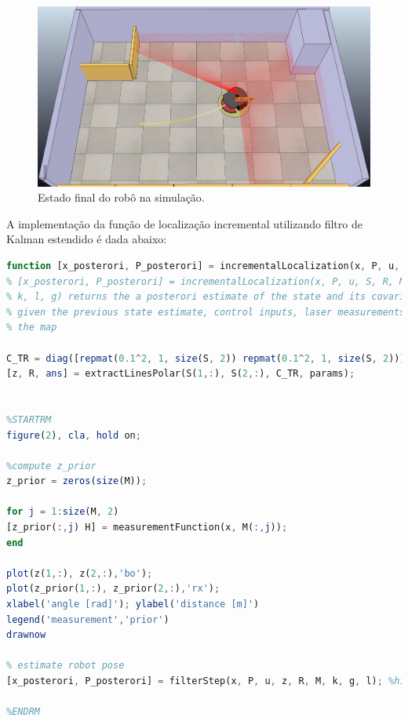 \begin{figure}[H]
	\centering
	\includegraphics[width=0.9\linewidth]{img/vrep}
	\caption{Estado final do robô na simulação.}
	\label{fig:vrep}
\end{figure}

A implementação da função de localização incremental utilizando filtro de Kalman estendido é dada abaixo:

\begin{lstlisting}[language=Octave]
function [x_posterori, P_posterori] = incrementalLocalization(x, P, u, S, M, params, k, g, l)
% [x_posterori, P_posterori] = incrementalLocalization(x, P, u, S, R, M,
% k, l, g) returns the a posterori estimate of the state and its covariance,
% given the previous state estimate, control inputs, laser measurements and
% the map

C_TR = diag([repmat(0.1^2, 1, size(S, 2)) repmat(0.1^2, 1, size(S, 2))]);
[z, R, ans] = extractLinesPolar(S(1,:), S(2,:), C_TR, params);


%STARTRM
figure(2), cla, hold on;

%compute z_prior
z_prior = zeros(size(M));

for j = 1:size(M, 2)
[z_prior(:,j) H] = measurementFunction(x, M(:,j));
end

plot(z(1,:), z(2,:),'bo');
plot(z_prior(1,:), z_prior(2,:),'rx');
xlabel('angle [rad]'); ylabel('distance [m]')
legend('measurement','prior')
drawnow

% estimate robot pose
[x_posterori, P_posterori] = filterStep(x, P, u, z, R, M, k, g, l); %hint: you just coded this function

%ENDRM
\end{lstlisting}


